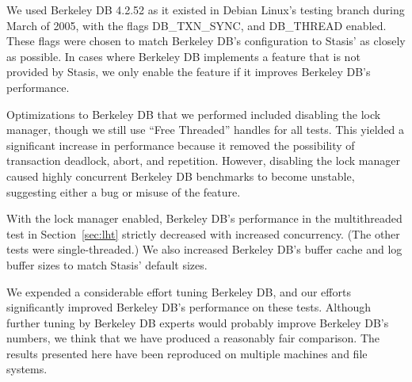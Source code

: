 \documentclass[letterpaper,twocolumn,10pt]{article}
\newcommand{\yad}{Stasis\xspace}
\newcommand{\yads}{Stasis'\xspace}
\begin{document}
We used Berkeley DB 4.2.52 as it existed in Debian Linux's testing
branch during March of 2005, with the flags DB\_TXN\_SYNC, and
DB\_THREAD enabled. These flags were chosen to match Berkeley DB's
configuration to \yads as closely as possible.  In cases where
Berkeley DB implements a feature that is not provided by \yad, we
only enable the feature if it improves Berkeley DB's performance.

Optimizations to Berkeley DB that we performed included disabling the
lock manager, though we still use ``Free Threaded'' handles for all
tests.  This yielded a significant increase in performance because it
removed the possibility of transaction deadlock, abort, and
repetition.  However, disabling the lock manager caused highly
concurrent Berkeley DB benchmarks to become unstable, suggesting either a
bug or misuse of the feature.  

With the lock manager enabled, Berkeley
DB's performance in the multithreaded test in Section~\ref{sec:lht} strictly decreased with
increased concurrency.  (The other tests were single-threaded.)  We also
increased Berkeley DB's buffer cache and log buffer sizes to match
\yads default sizes.

We expended a considerable effort tuning Berkeley DB, and our efforts
significantly improved Berkeley DB's performance on these tests.
Although further tuning by Berkeley DB experts would probably improve
Berkeley DB's numbers, we think that we have produced a reasonably
fair comparison.  The results presented here have been reproduced on
multiple machines and file systems.
\end{document}
